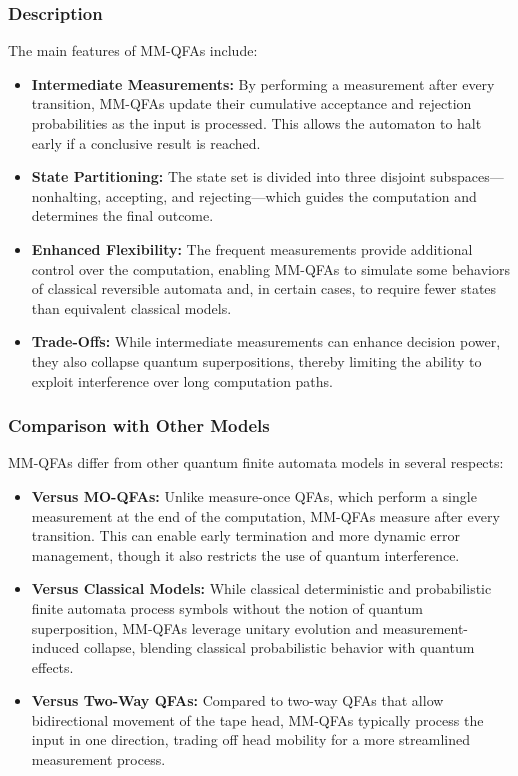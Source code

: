 \subsubsection{Description}
The main features of MM-QFAs include:
\begin{itemize}
  \item \textbf{Intermediate Measurements:} By performing a measurement after every transition, MM-QFAs update their cumulative acceptance and rejection probabilities as the input is processed. This allows the automaton to halt early if a conclusive result is reached.
  \item \textbf{State Partitioning:} The state set is divided into three disjoint subspaces—nonhalting, accepting, and rejecting—which guides the computation and determines the final outcome.
  \item \textbf{Enhanced Flexibility:} The frequent measurements provide additional control over the computation, enabling MM-QFAs to simulate some behaviors of classical reversible automata and, in certain cases, to require fewer states than equivalent classical models.
  \item \textbf{Trade-Offs:} While intermediate measurements can enhance decision power, they also collapse quantum superpositions, thereby limiting the ability to exploit interference over long computation paths.
\end{itemize}

\subsubsection{Comparison with Other Models}
MM-QFAs differ from other quantum finite automata models in several respects:
\begin{itemize}
  \item \textbf{Versus MO-QFAs:} Unlike measure-once QFAs, which perform a single measurement at the end of the computation, MM-QFAs measure after every transition. This can enable early termination and more dynamic error management, though it also restricts the use of quantum interference.
  \item \textbf{Versus Classical Models:} While classical deterministic and probabilistic finite automata process symbols without the notion of quantum superposition, MM-QFAs leverage unitary evolution and measurement-induced collapse, blending classical probabilistic behavior with quantum effects.
  \item \textbf{Versus Two-Way QFAs:} Compared to two-way QFAs that allow bidirectional movement of the tape head, MM-QFAs typically process the input in one direction, trading off head mobility for a more streamlined measurement process.
\end{itemize}

